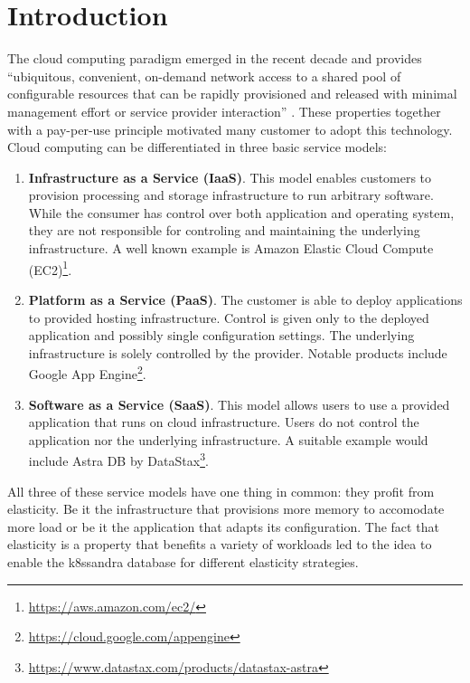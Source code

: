\chapter{Introduction}
\label{ch:introduction}

The cloud computing paradigm emerged in the recent decade and provides ``ubiquitous, convenient, on-demand network access to a shared pool of configurable resources that can be rapidly provisioned and released with minimal management effort or service provider interaction'' \cite{mellNISTDefinitionCloud2011a}. These properties together with a pay-per-use principle motivated many customer to adopt this technology. Cloud computing can be differentiated in three basic service models:

\begin{enumerate}
    \item \textbf{Infrastructure as a Service (IaaS)}. This model enables customers to provision processing and storage infrastructure to run arbitrary software. While the consumer has control over both application and operating system, they are not responsible for controling and maintaining the underlying infrastructure. A well known example is Amazon Elastic Cloud Compute (EC2)\footnote{\url{https://aws.amazon.com/ec2/}}.

    \item \textbf{Platform as a Service (PaaS)}. The customer is able to deploy applications to provided hosting infrastructure. Control is given only to the deployed application and possibly single configuration settings. The underlying infrastructure is solely controlled by the provider. Notable products include Google App Engine\footnote{\url{https://cloud.google.com/appengine}}.

    \item \textbf{Software as a Service (SaaS)}. This model allows users to use a provided application that runs on cloud infrastructure. Users do not control the application nor the underlying infrastructure. A suitable example would include Astra DB by DataStax\footnote{\url{https://www.datastax.com/products/datastax-astra}}.
\end{enumerate}

All three of these service models have one thing in common: they profit from elasticity. Be it the infrastructure that provisions more memory to accomodate more load or be it the application that adapts its configuration. The fact that elasticity is a property that benefits a variety of workloads led to the idea to enable the k8ssandra database for different elasticity strategies.

